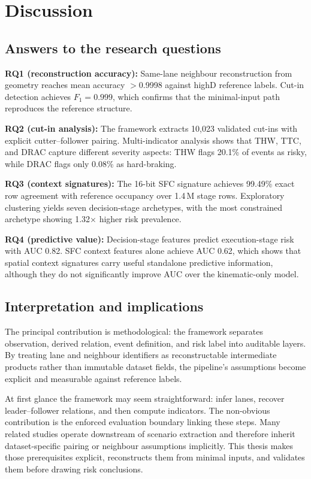 \documentclass[12pt,a4paper,twoside,openright]{report}
\begin{document}
    \chapter{Discussion}
    \label{chap:discussion}

    \section{Answers to the research questions}
    \textbf{RQ1 (reconstruction accuracy):} Same-lane neighbour reconstruction from geometry reaches mean accuracy $>$0.9998 against highD reference labels. Cut-in detection achieves $F_1 = 0.999$, which confirms that the minimal-input path reproduces the reference structure.

    \textbf{RQ2 (cut-in analysis):} The framework extracts 10,023 validated cut-ins with explicit cutter--follower pairing. Multi-indicator analysis shows that THW, TTC, and DRAC capture different severity aspects: THW flags 20.1\% of events as risky, while DRAC flags only 0.08\% as hard-braking.

    \textbf{RQ3 (context signatures):} The 16-bit SFC signature achieves 99.49\% exact row agreement with reference occupancy over 1.4\,M stage rows. Exploratory clustering yields seven decision-stage archetypes, with the most constrained archetype showing 1.32$\times$ higher risk prevalence.

    \textbf{RQ4 (predictive value):} Decision-stage features predict execution-stage risk with AUC 0.82. SFC context features alone achieve AUC 0.62, which shows that spatial context signatures carry useful standalone predictive information, although they do not significantly improve AUC over the kinematic-only model.

    \section{Interpretation and implications}
    The principal contribution is methodological: the framework separates observation, derived relation, event definition, and risk label into auditable layers. By treating lane and neighbour identifiers as reconstructable intermediate products rather than immutable dataset fields, the pipeline's assumptions become explicit and measurable against reference labels.

    At first glance the framework may seem straightforward: infer lanes, recover leader--follower relations, and then compute indicators. The non-obvious contribution is the enforced evaluation boundary linking these steps. Many related studies operate downstream of scenario extraction and therefore inherit dataset-specific pairing or neighbour assumptions implicitly. This thesis makes those prerequisites explicit, reconstructs them from minimal inputs, and validates them before drawing risk conclusions.
\end{document}
